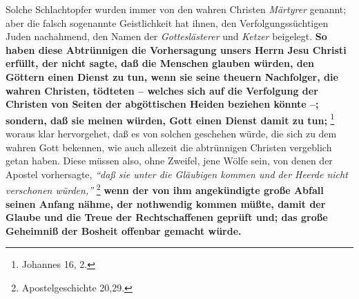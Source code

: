 Solche Schlachtopfer wurden immer von den wahren Christen \textit{Märtyrer} genannt;
aber die falsch sogenannte Geistlichkeit hat ihnen, den Verfolgungssüchtigen
Juden nachahmend, den Namen der \textit{Gotteslästerer} und \textit{Ketzer} beigelegt. 
\textbf{So haben diese Abtrünnigen die Vorhersagung unsers Herrn Jesu Christi erfüllt, der nicht sagte, daß die Menschen glauben würden, den Göttern einen Dienst zu tun, wenn sie seine theuern Nachfolger, die wahren Christen, tödteten
-- welches sich auf die Verfolgung der Christen von Seiten der abgöttischen
Heiden beziehen könnte --; sondern, daß sie meinen würden, Gott einen Dienst
damit zu tun;}
\footnote{Johannes 16, 2.}
woraus klar hervorgehet, daß es von solchen
geschehen würde, die sich zu dem wahren Gott bekennen, wie auch allezeit die
abtrünnigen Christen vergeblich getan haben. Diese müssen also, ohne Zweifel,
jene Wölfe sein, von denen der Apostel vorhersagte,
\textit{"`daß sie unter die
Gläubigen kommen und der Heerde nicht verschonen würden,"'}
\footnote{Apostelgeschichte 20,29.}
\textbf{wenn der von ihm angekündigte große Abfall seinen Anfang nähme, der
nothwendig kommen müßte, damit der Glaube und die Treue der Rechtschaffenen
geprüft und; das große Geheimniß der Bosheit offenbar gemacht würde.}

\medskip

